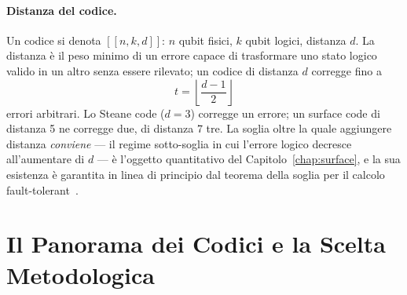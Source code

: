 \begin{onehalfspace}
\paragraph{Distanza del codice.}
Un codice si denota $[[n, k, d]]$: $n$ qubit fisici, $k$ qubit logici, distanza $d$. La distanza è il peso minimo di un errore capace di trasformare uno stato logico valido in un altro senza essere rilevato; un codice di distanza $d$ corregge fino a
\begin{equation}
    t = \left\lfloor \frac{d-1}{2} \right\rfloor
    \label{eq:distanza_t}
\end{equation}
errori arbitrari. Lo Steane code ($d=3$) corregge un errore; un surface code di distanza 5 ne corregge due, di distanza 7 tre. La soglia oltre la quale aggiungere distanza \emph{conviene} --- il regime sotto-soglia in cui l'errore logico decresce all'aumentare di $d$ --- è l'oggetto quantitativo del Capitolo~\ref{chap:surface}, e la sua esistenza è garantita in linea di principio dal teorema della soglia per il calcolo fault-tolerant~\cite{aharonov1997fault}.

\section{Il Panorama dei Codici e la Scelta Metodologica}
\label{sec:confronto_codici}


\end{onehalfspace}
